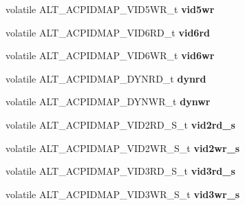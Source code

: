 \begin{DoxyCompactItemize}
\mbox{\label{structALT__ACPIDMAP__s_a37a1bbcfa8366526ede34a0f462fa46e}} 
volatile A\+L\+T\+\_\+\+A\+C\+P\+I\+D\+M\+A\+P\+\_\+\+V\+I\+D5\+W\+R\+\_\+t {\bfseries vid5wr}
\item 
\mbox{\label{structALT__ACPIDMAP__s_a2d968369709d4099d12929fcb469db9b}} 
volatile A\+L\+T\+\_\+\+A\+C\+P\+I\+D\+M\+A\+P\+\_\+\+V\+I\+D6\+R\+D\+\_\+t {\bfseries vid6rd}
\item 
\mbox{\label{structALT__ACPIDMAP__s_aef656d8e1bf1c70af75ede871cc9bfdb}} 
volatile A\+L\+T\+\_\+\+A\+C\+P\+I\+D\+M\+A\+P\+\_\+\+V\+I\+D6\+W\+R\+\_\+t {\bfseries vid6wr}
\item 
\mbox{\label{structALT__ACPIDMAP__s_aa46ce4903b86462f7c6692a2f6c7b17e}} 
volatile A\+L\+T\+\_\+\+A\+C\+P\+I\+D\+M\+A\+P\+\_\+\+D\+Y\+N\+R\+D\+\_\+t {\bfseries dynrd}
\item 
\mbox{\label{structALT__ACPIDMAP__s_ad95648ea71a669057653b03db649620f}} 
volatile A\+L\+T\+\_\+\+A\+C\+P\+I\+D\+M\+A\+P\+\_\+\+D\+Y\+N\+W\+R\+\_\+t {\bfseries dynwr}
\item 
\mbox{\label{structALT__ACPIDMAP__s_a2b419e1a8345ee008afce734998104a4}} 
volatile A\+L\+T\+\_\+\+A\+C\+P\+I\+D\+M\+A\+P\+\_\+\+V\+I\+D2\+R\+D\+\_\+\+S\+\_\+t {\bfseries vid2rd\+\_\+s}
\item 
\mbox{\label{structALT__ACPIDMAP__s_aa5858121ffe0292c9937d38e307bb2bd}} 
volatile A\+L\+T\+\_\+\+A\+C\+P\+I\+D\+M\+A\+P\+\_\+\+V\+I\+D2\+W\+R\+\_\+\+S\+\_\+t {\bfseries vid2wr\+\_\+s}
\item 
\mbox{\label{structALT__ACPIDMAP__s_a0a03f099a1a5c7e559f315e5791b01da}} 
volatile A\+L\+T\+\_\+\+A\+C\+P\+I\+D\+M\+A\+P\+\_\+\+V\+I\+D3\+R\+D\+\_\+\+S\+\_\+t {\bfseries vid3rd\+\_\+s}
\item 
\mbox{\label{structALT__ACPIDMAP__s_aa9aa2211ef3910af1b08674a96e862ed}} 
volatile A\+L\+T\+\_\+\+A\+C\+P\+I\+D\+M\+A\+P\+\_\+\+V\+I\+D3\+W\+R\+\_\+\+S\+\_\+t {\bfseries vid3wr\+\_\+s}
\item 

\end{DoxyCompactItemize}
